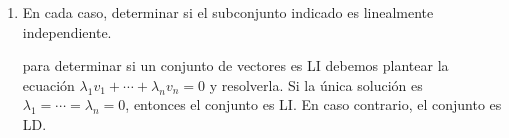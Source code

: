 \begin{enumerate}[resume, topsep=6pt, itemsep=.4cm]
    \item\label{son LI} En cada caso, determinar si el subconjunto indicado es linealmente independiente.
    
    \rta para determinar si un conjunto de vectores es LI debemos plantear la ecuación $\lambda_1 v_1+\cdots+\lambda_n v_n=0$ y resolverla. Si la única solución es $\lambda_1=\cdots=\lambda_n=0$, entonces el conjunto es LI. En caso contrario, el conjunto es LD.


\end{enumerate}
